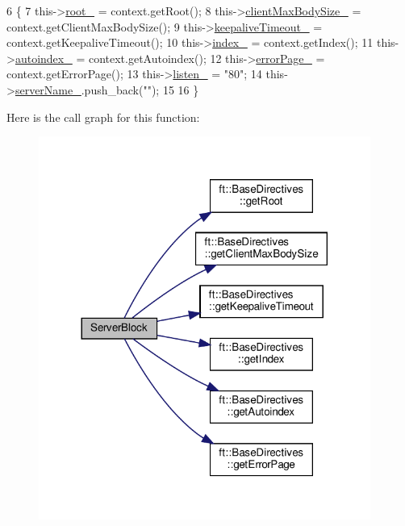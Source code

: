 \begin{DoxyCode}
6     \{
7         this->\hyperlink{classft_1_1_base_directives_abb1eaf0bba10b90172d6152e69457dc7}{root\_} = context.getRoot();
8         this->\hyperlink{classft_1_1_base_directives_ad65c2594d2a90ca065d410dfd4066a19}{clientMaxBodySize\_} = context.getClientMaxBodySize();
9         this->\hyperlink{classft_1_1_base_directives_aa1f5f394b428d0d18765a9b9e14e648f}{keepaliveTimeout\_} = context.getKeepaliveTimeout();
10         this->\hyperlink{classft_1_1_base_directives_a6ba30626837f300201cd32c35d50aa49}{index\_} = context.getIndex();
11         this->\hyperlink{classft_1_1_base_directives_a4ebffbe32f50a462afa139c6f03c1a4f}{autoindex\_} = context.getAutoindex();
12         this->\hyperlink{classft_1_1_base_directives_a5c0d388109f086503961de84fe3fce90}{errorPage\_} = context.getErrorPage();
13         this->\hyperlink{classft_1_1_server_block_a5105357e893dd34d8e22d48def2fbafa}{listen\_} = \textcolor{stringliteral}{"80"};
14         this->\hyperlink{classft_1_1_server_block_adc26ae834350b4c964d4198e7a431e90}{serverName\_}.push\_back(\textcolor{stringliteral}{""});
15 
16     \}
\end{DoxyCode}
Here is the call graph for this function\+:
\nopagebreak
\begin{figure}[H]
\begin{center}
\leavevmode
\includegraphics[width=308pt]{classft_1_1_server_block_ac14b720cf43fb61943107d397f5427f4_cgraph}
\end{center}
\end{figure}


